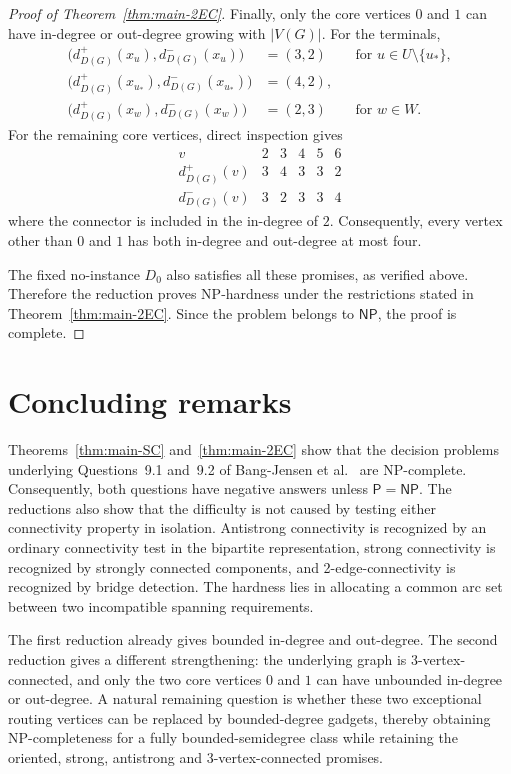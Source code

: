 \documentclass[12pt]{article}
\theoremstyle{remark}
\newcommand{\NP}{\mathsf{NP}}
\begin{document}
\begin{proof}[Proof of Theorem~\ref{thm:main-2EC}]
Finally, only the core vertices $0$ and $1$ can have in-degree or out-degree growing with $|V(G)|$. For the terminals,
\[
\begin{aligned}
 \bigl(d_{D(G)}^+(x_u),d_{D(G)}^-(x_u)\bigr)
   &=(3,2)
   &&\text{for }u\in U\setminus\{u_*\},\\
 \bigl(d_{D(G)}^+(x_{u_*}),d_{D(G)}^-(x_{u_*})\bigr)
   &=(4,2),\\
 \bigl(d_{D(G)}^+(x_w),d_{D(G)}^-(x_w)\bigr)
   &=(2,3)
   &&\text{for }w\in W.
\end{aligned}
\]
For the remaining core vertices, direct inspection gives
\[
\begin{array}{c|ccccc}
 v & 2 & 3 & 4 & 5 & 6\\ \hline
 d_{D(G)}^+(v) & 3 & 4 & 3 & 3 & 2\\
 d_{D(G)}^-(v) & 3 & 2 & 3 & 3 & 4
\end{array}
\]
where the connector is included in the in-degree of $2$. Consequently, every vertex other than $0$ and $1$ has both in-degree and out-degree at most four.

The fixed no-instance $D_0$ also satisfies all these promises, as verified above.  Therefore the reduction proves NP-hardness under
the restrictions stated in Theorem~\ref{thm:main-2EC}.  Since the problem belongs to $\NP$, the proof is complete.
\end{proof}

\section{Concluding remarks}
Theorems~\ref{thm:main-SC} and~\ref{thm:main-2EC} show that the decision problems underlying Questions~9.1 and~9.2 of Bang-Jensen et al.~\cite{BBJK} are NP-complete.  Consequently,
both questions have negative answers unless $\mathsf{P}=\mathsf{NP}$.  The reductions also show that the difficulty is not caused by testing either connectivity property in isolation.  Antistrong connectivity is recognized by an ordinary connectivity test in the bipartite  representation, strong connectivity is recognized by strongly connected components, and 2-edge-connectivity is recognized by bridge detection. The hardness
lies in allocating a common arc set between two incompatible spanning requirements.

The first reduction already gives bounded in-degree and
out-degree. The second reduction gives a different strengthening:
the underlying graph is 3-vertex-connected, and only the two core vertices $0$ and $1$ can have unbounded in-degree or out-degree.
A natural remaining question is whether these two exceptional routing vertices can be replaced by bounded-degree gadgets, thereby
obtaining NP-completeness for a fully bounded-semidegree class while retaining the oriented, strong, antistrong and 3-vertex-connected promises.
\end{document}

